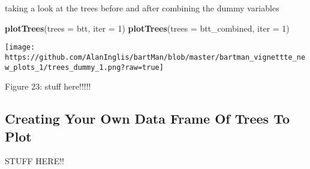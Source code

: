 \documentclass[
]{article}
\newenvironment{Shaded}{\begin{snugshade}}{\end{snugshade}}
\newcommand{\AttributeTok}[1]{\textcolor[rgb]{0.13,0.29,0.53}{#1}}
\newcommand{\DecValTok}[1]{\textcolor[rgb]{0.00,0.00,0.81}{#1}}
\newcommand{\FunctionTok}[1]{\textcolor[rgb]{0.13,0.29,0.53}{\textbf{#1}}}
\newcommand{\NormalTok}[1]{#1}
\begin{document}
taking a look at the trees before and after combining the dummy
variables

\begin{Shaded}
\begin{Highlighting}[]
\FunctionTok{plotTrees}\NormalTok{(}\AttributeTok{trees =}\NormalTok{ btt, }\AttributeTok{iter =} \DecValTok{1}\NormalTok{)}
\FunctionTok{plotTrees}\NormalTok{(}\AttributeTok{trees =}\NormalTok{ btt\_combined, }\AttributeTok{iter =} \DecValTok{1}\NormalTok{)}
\end{Highlighting}
\end{Shaded}

\begin{center}\texttt{[image: https://github.com/AlanInglis/bartMan/blob/master/bartman\_vignettte\_new\_plots\_1/trees\_dummy\_1.png?raw=true]} \end{center}

\protect\hypertarget{fig23:fig23}{}{Figure 23: }stuff here!!!!!

\hypertarget{creating-your-own-data-frame-of-trees-to-plot}{%
\subsection{Creating Your Own Data Frame Of Trees To
Plot}\label{creating-your-own-data-frame-of-trees-to-plot}}

STUFF HERE!!
\end{document}
